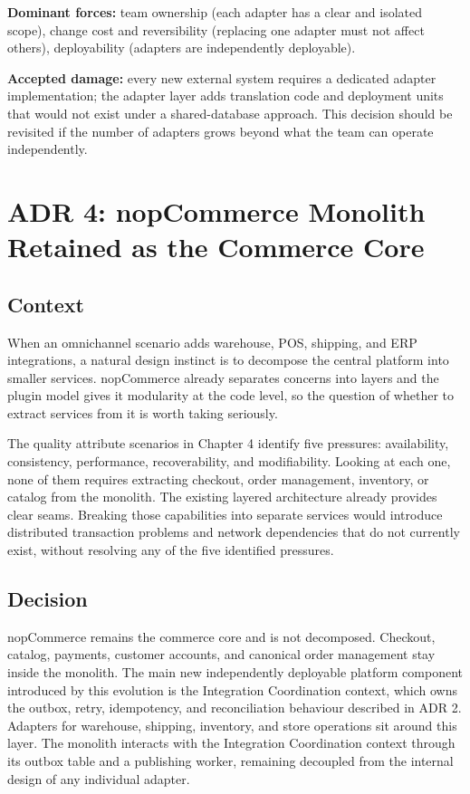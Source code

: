 \textbf{Dominant forces:} team ownership (each adapter has a clear and isolated scope),
change cost and reversibility (replacing one adapter must not affect others), deployability
(adapters are independently deployable).

\textbf{Accepted damage:} every new external system requires a dedicated adapter
implementation; the adapter layer adds translation code and deployment units that would not
exist under a shared-database approach. This decision should be revisited if the number of
adapters grows beyond what the team can operate independently.

\section{ADR 4: nopCommerce Monolith Retained as the Commerce Core}

\subsection{Context}

When an omnichannel scenario adds warehouse, POS, shipping, and ERP integrations, a natural
design instinct is to decompose the central platform into smaller services. nopCommerce already
separates concerns into layers and the plugin model gives it modularity at the code level, so
the question of whether to extract services from it is worth taking seriously.

The quality attribute scenarios in Chapter 4 identify five pressures: availability,
consistency, performance, recoverability, and modifiability. Looking at each one, none of them
requires extracting checkout, order management, inventory, or catalog from the monolith. The
existing layered architecture already provides clear seams. Breaking those capabilities into
separate services would introduce distributed transaction problems and network dependencies that
do not currently exist, without resolving any of the five identified pressures.

\subsection{Decision}

nopCommerce remains the commerce core and is not decomposed. Checkout, catalog, payments,
customer accounts, and canonical order management stay inside the monolith. The main new
independently deployable platform component introduced by this evolution is the Integration
Coordination context, which owns the outbox, retry, idempotency, and reconciliation behaviour
described in ADR 2. Adapters for warehouse, shipping, inventory, and store operations sit around this layer.
The monolith interacts with the Integration Coordination context through its outbox table and a
publishing worker, remaining decoupled from the internal design of any individual
adapter.

